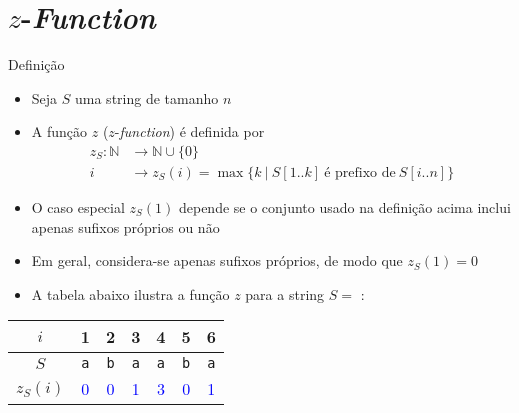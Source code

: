 \section{$z$-{\it Function}}

\begin{frame}[fragile]{Definição}

    \begin{itemize}
        \item Seja $S$ uma string de tamanho $n$

        \item A função $z$ ($z$-\textit{function}) é definida por
        \begin{align*}
            z_S: \mathbb{N} & \to \mathbb{N}\cup \lbrace 0\rbrace \\
               i & \to z_S(i) = \max\lbrace k\ |\ S[1..k]\ \mbox{é prefixo de}\ S[i..n] \rbrace
        \end{align*}

        \item O caso especial $z_S(1)$ depende se o conjunto usado na definição acima inclui
            apenas sufixos próprios ou não

        \item Em geral, considera-se apenas sufixos próprios, de modo que $z_S(1) = 0$

        \item A tabela abaixo ilustra a função $z$ para a string $S = $ :
    \end{itemize}

    \begin{center}
        \begin{tabular}{c|cccccc}
        $i$ & 1 & 2 & 3 & 4 & 5 & 6 \\
        \hline
        $S$ & \texttt{\textcolor{red!80!black}{a}} & \texttt{\textcolor{red!80!black}{b}} & \texttt{\textcolor{red!80!black}{a}} & \texttt{\textcolor{red!80!black}{a}} & \texttt{\textcolor{red!80!black}{b}} & \texttt{\textcolor{red!80!black}{a}} \\
        $z_S(i)$ & \textcolor{blue}{0} & \textcolor{blue}{0} & \textcolor{blue}{1} & \textcolor{blue}{3} & \textcolor{blue}{0} & \textcolor{blue}{1} \\
        \end{tabular}
    \end{center}
\end{frame}


